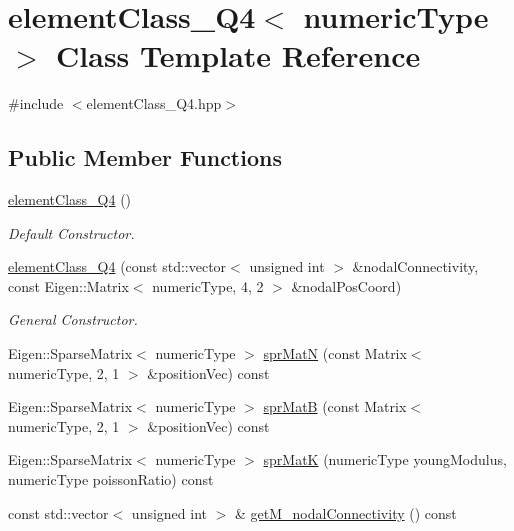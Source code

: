 \hypertarget{classelement_class___q4}{}\section{element\+Class\+\_\+\+Q4$<$ numeric\+Type $>$ Class Template Reference}
\label{classelement_class___q4}


{\ttfamily \#include $<$element\+Class\+\_\+\+Q4.\+hpp$>$}

\subsection*{Public Member Functions}
\begin{DoxyCompactItemize}
\item 
\mbox{\label{classelement_class___q4_a394807d1b7b587bdf8a9fef0ad207cb0}} 
\mbox{\hyperlink{classelement_class___q4_a394807d1b7b587bdf8a9fef0ad207cb0}{element\+Class\+\_\+\+Q4}} ()
\begin{DoxyCompactList}\small\item\em Default Constructor. \end{DoxyCompactList}\item 
\mbox{\label{classelement_class___q4_a26cbfc05c8238f05269a7a596bed8264}} 
\mbox{\hyperlink{classelement_class___q4_a26cbfc05c8238f05269a7a596bed8264}{element\+Class\+\_\+\+Q4}} (const std\+::vector$<$ unsigned int $>$ \&nodal\+Connectivity, const Eigen\+::\+Matrix$<$ numeric\+Type, 4, 2 $>$ \&nodal\+Pos\+Coord)
\begin{DoxyCompactList}\small\item\em General Constructor. \end{DoxyCompactList}\item 
Eigen\+::\+Sparse\+Matrix$<$ numeric\+Type $>$ \mbox{\hyperlink{classelement_class___q4_adc47e0786349f327fe45e3744080d3c5}{spr\+MatN}} (const Matrix$<$ numeric\+Type, 2, 1 $>$ \&position\+Vec) const
\item 
Eigen\+::\+Sparse\+Matrix$<$ numeric\+Type $>$ \mbox{\hyperlink{classelement_class___q4_a7503f92c139700e19433c2843496b670}{spr\+MatB}} (const Matrix$<$ numeric\+Type, 2, 1 $>$ \&position\+Vec) const
\item 
Eigen\+::\+Sparse\+Matrix$<$ numeric\+Type $>$ \mbox{\hyperlink{classelement_class___q4_afcfb65b64fe9909300405219739ed496}{spr\+MatK}} (numeric\+Type young\+Modulus, numeric\+Type poisson\+Ratio) const
\item 
const std\+::vector$<$ unsigned int $>$ \& \mbox{\hyperlink{classelement_class___q4_abe3f00cce16a360c1810f50f56fff445}{get\+M\+\_\+nodal\+Connectivity}} () const
\end{DoxyCompactItemize}


